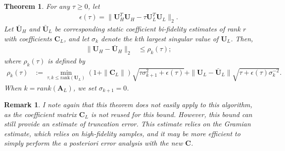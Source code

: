\documentclass{report}
\newtheorem{thm}{Theorem}[section]
\newtheorem{remark}{Remark}[section]
\begin{document}
\begin{thm}
\label{thm:bifi}
For any $\tau\ge 0$, let 
\begin{align}
\epsilon(\tau) = \|\bm{U}_H^T\bm{U}_H - \tau \bm{U}_L^T\bm{U}_L\|_2.
\end{align}
Let $\bar{\bm{U}}_H$ and $\bar{\bm{U}}_L$ be corresponding static coefficient bi-fidelity estimates of rank $r$ with coefficients $\bm{C}_L$, and let $\sigma_k$ denote the $k$th largest singular value of $\bm{U}_L$. Then,
\begin{align}
 \|\bm{U}_H - \bar{\bm{U}}_H\|_2 &\le \rho_k(\tau);
\end{align}
 where $\rho_k(\tau)$ is defined by
 \begin{align}
 \rho_k(\tau) &:= \mathop{\min}\limits_{\tau,k\le\mbox{rank}(\bm{U}_L)} (1+\|\bm{C}_L\|)\sqrt{\tau\sigma_{k+1}^2 + \epsilon(\tau)} + \|\bm{U}_L-\bar{\bm{U}}_L\|\sqrt{\tau + \epsilon(\tau)\sigma_k^{-2}}.
\end{align}
When $k = rank(\bm{A}_L)$, we set $\sigma_{k+1}=0$.
\end{thm}
\begin{remark}
 I note again that this theorem does not easily apply to this algorithm, as the coefficient matrix $\bm{C}_L$ is not reused for this bound. However, this bound can still provide an estimate of truncation error. This estimate relies on the Gramian estimate, which relies on high-fidelity samples, and it may be more efficient to simply perform the a posteriori error analysis with the new $\bm{C}$.
\end{remark}
\end{document}
